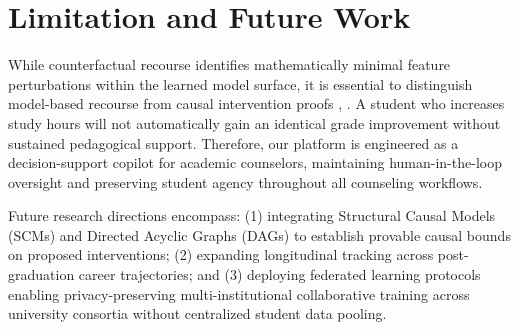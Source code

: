 \documentclass[conference]{IEEEtran}
\begin{document}
\begin{table}[htbp]
\caption{Fairness and Subgroup Parity Audit across Protected Demographic Attributes}
\label{tab:fairness}
\centering
{}
\end{table}

\section{Limitation and Future Work}
While counterfactual recourse identifies mathematically minimal feature perturbations within the learned model surface, it is essential to distinguish model-based recourse from causal intervention proofs \cite{pearl2009}, \cite{scholkopf2021}. A student who increases study hours will not automatically gain an identical grade improvement without sustained pedagogical support. Therefore, our platform is engineered as a decision-support copilot for academic counselors, maintaining human-in-the-loop oversight and preserving student agency throughout all counseling workflows.

Future research directions encompass: (1) integrating Structural Causal Models (SCMs) and Directed Acyclic Graphs (DAGs) to establish provable causal bounds on proposed interventions; (2) expanding longitudinal tracking across post-graduation career trajectories; and (3) deploying federated learning protocols enabling privacy-preserving multi-institutional collaborative training across university consortia without centralized student data pooling.
\end{document}
